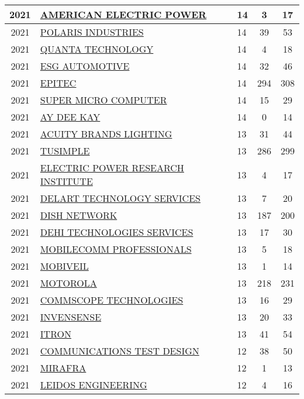 \documentclass{article}%
\begin{document}
\begin{longtable}{c|p{20em}|p{5em}|c|c}
\hline%
2021&\hyperref[subsec:AMERICANELECTRICPOWER]{AMERICAN ELECTRIC POWER}&14&3&17\\%
\hline%
2021&\hyperref[subsec:POLARISINDUSTRIES]{POLARIS INDUSTRIES}&14&39&53\\%
\hline%
2021&\hyperref[subsec:QUANTATECHNOLOGY]{QUANTA TECHNOLOGY}&14&4&18\\%
\hline%
2021&\hyperref[subsec:ESGAUTOMOTIVE]{ESG AUTOMOTIVE}&14&32&46\\%
\hline%
2021&\hyperref[subsec:EPITEC]{EPITEC}&14&294&308\\%
\hline%
2021&\hyperref[subsec:SUPERMICROCOMPUTER]{SUPER MICRO COMPUTER}&14&15&29\\%
\hline%
2021&\hyperref[subsec:AYDEEKAY]{AY DEE KAY}&14&0&14\\%
\hline%
2021&\hyperref[subsec:ACUITYBRANDSLIGHTING]{ACUITY BRANDS LIGHTING}&13&31&44\\%
\hline%
2021&\hyperref[subsec:TUSIMPLE]{TUSIMPLE}&13&286&299\\%
\hline%
2021&\hyperref[subsec:ELECTRICPOWERRESEARCHINSTITUTE]{ELECTRIC POWER RESEARCH INSTITUTE}&13&4&17\\%
\hline%
2021&\hyperref[subsec:DELARTTECHNOLOGYSERVICES]{DELART TECHNOLOGY SERVICES}&13&7&20\\%
\hline%
2021&\hyperref[subsec:DISHNETWORK]{DISH NETWORK}&13&187&200\\%
\hline%
2021&\hyperref[subsec:DEHITECHNOLOGIESSERVICES]{DEHI TECHNOLOGIES SERVICES}&13&17&30\\%
\hline%
2021&\hyperref[subsec:MOBILECOMMPROFESSIONALS]{MOBILECOMM PROFESSIONALS}&13&5&18\\%
\hline%
2021&\hyperref[subsec:MOBIVEIL]{MOBIVEIL}&13&1&14\\%
\hline%
2021&\hyperref[subsec:MOTOROLA]{MOTOROLA}&13&218&231\\%
\hline%
2021&\hyperref[subsec:COMMSCOPETECHNOLOGIES]{COMMSCOPE TECHNOLOGIES}&13&16&29\\%
\hline%
2021&\hyperref[subsec:INVENSENSE]{INVENSENSE}&13&20&33\\%
\hline%
2021&\hyperref[subsec:ITRON]{ITRON}&13&41&54\\%
\hline%
2021&\hyperref[subsec:COMMUNICATIONSTESTDESIGN]{COMMUNICATIONS TEST DESIGN}&12&38&50\\%
\hline%
2021&\hyperref[subsec:MIRAFRA]{MIRAFRA}&12&1&13\\%
\hline%
2021&\hyperref[subsec:LEIDOSENGINEERING]{LEIDOS ENGINEERING}&12&4&16\\%
\hline%

\end{longtable}
\end{document}

